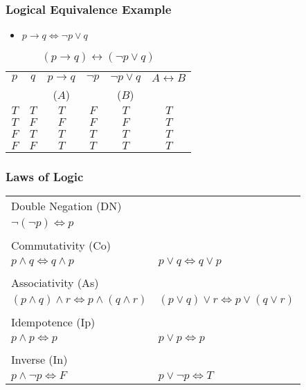 \documentclass[dvipsnames]{beamer}
\begin{document}
\begin{frame}
  \frametitle{Logical Equivalence Example}

  \begin{example}
    \begin{itemize}
      \item $p \rightarrow q \Leftrightarrow \neg p \vee q$
    \end{itemize}

    \begin{table}
      \caption{$(p \rightarrow q) \leftrightarrow (\neg p \vee q)$}
      \begin{tabular}{|c|c|c|c|c||c|}\hline
        $p$ & $q$ & $p \rightarrow q$ & $\neg p$ & $\neg p \vee q$ & $A \leftrightarrow B$\\
            &     & ($A$)             &          & ($B$)           &\\\hline\hline
        $T$ & $T$ & $T$ & $F$ & $T$ & $T$\\\hline
        $T$ & $F$ & $F$ & $F$ & $F$ & $T$\\\hline
        $F$ & $T$ & $T$ & $T$ & $T$ & $T$\\\hline
        $F$ & $F$ & $T$ & $T$ & $T$ & $T$\\\hline
      \end{tabular}
    \end{table}
  \end{example}
\end{frame}

\begin{frame}
  \frametitle{Laws of Logic}

  \begin{tabular}{ll}
  \alert{Double Negation (DN)} &\\
    $\neg (\neg p) \Leftrightarrow p$ &\\\\
  \pause
  \alert{Commutativity (Co)} &\\
    $p \wedge q \Leftrightarrow q \wedge p$ &
    $p \vee q \Leftrightarrow q \vee p$\\\\
  \pause
  \alert{Associativity (As)} &\\
    $(p \wedge q) \wedge r \Leftrightarrow p \wedge (q \wedge r)$ &
    $(p \vee q) \vee r \Leftrightarrow p \vee (q \vee r)$\\\\
  \pause
  \alert{Idempotence (Ip)} &\\
    $p \wedge p \Leftrightarrow p$ &
    $p \vee p \Leftrightarrow p$\\\\
  \pause
  \alert{Inverse (In)} &\\
    $p \wedge \neg p \Leftrightarrow F$ &
    $p \vee \neg p \Leftrightarrow T$
  \end{tabular}
\end{frame}
\end{document}

